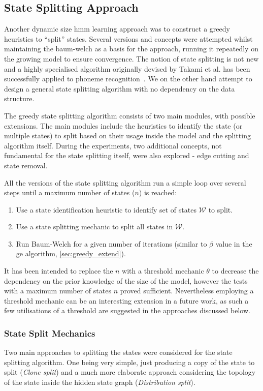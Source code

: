 \subsection{State Splitting Approach}
\label{sec:state_splitting}
Another dynamic size \gls{hmm} learning approach was to construct a greedy heuristics to ``split'' states. Several versions and concepts were attempted whilst maintaining the \gls{baum-welch} as a basis for the approach, running it repeatedly on the growing model to ensure convergence. The notion of state splitting is not new and a highly specialised algorithm originally devised by Takami et al. has been successfully applied to phoneme recognition~\cite{takami1992, singer1996}. We on the other hand attempt to design a general state splitting algorithm with no dependency on the data structure.

The greedy state splitting algorithm consists of two main modules, with possible extensions. The main modules include the heuristics to identify the state (or multiple states) to split based on their usage inside the model and the splitting algorithm itself. During the experiments, two additional concepts, not fundamental for the state splitting itself, were also explored - edge cutting and state removal.

All the versions of the state splitting algorithm run a simple loop over several steps until a maximum number of states ($n$) is reached:
\begin{enumerate}
	\item Use a state identification heuristic to identify set of states $\mathcal{W}$ to split.
	\item Use a state splitting mechanic to split all states in $\mathcal{W}$.
	\item Run Baum-Welch for a given number of iterations (similar to $\beta$ value in the \acrlong{ge} algorithm, \ref{sec:greedy_extend}).
\end{enumerate}

It has been intended to replace the $n$ with a threshold mechanic $\theta$ to decrease the dependency on the prior knowledge of the size of the model, however the tests with a maximum number of states $n$ proved sufficient. Nevertheless employing a threshold mechanic can be an interesting extension in a future work, as such a few utilisations of a threshold are suggested in the approaches discussed below.

\subsubsection{State Split Mechanics}
Two main approaches to splitting the states were considered for the state splitting algorithm. One being very simple, just producing a copy of the state to split (\emph{Clone split}) and a much more elaborate approach considering the topology of the state inside the hidden state graph (\emph{Distribution split}).

